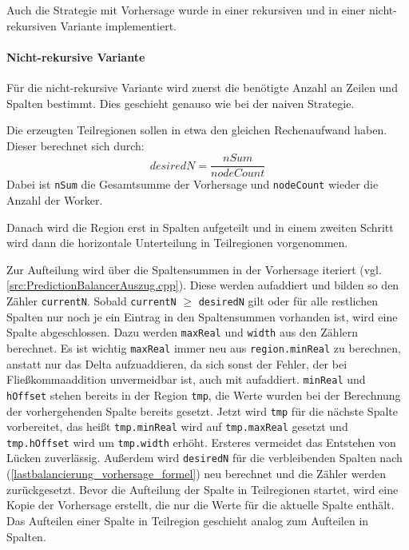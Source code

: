 Auch die Strategie mit Vorhersage wurde in einer rekursiven und in einer nicht-rekursiven Variante implementiert.

\paragraph*{Nicht-rekursive Variante}\label{lastbalancierung_vorhersage}
Für die nicht-rekursive Variante wird zuerst die benötigte Anzahl an Zeilen und Spalten bestimmt.
Dies geschieht genauso wie bei der naiven Strategie.

Die erzeugten Teilregionen sollen in etwa den gleichen Rechenaufwand haben. Dieser berechnet sich durch:
\begin{equation}\label{lastbalancierung_vorhersage_formel}
	desiredN = \frac{nSum}{nodeCount}
\end{equation}
Dabei ist \verb|nSum| die Gesamtsumme der Vorhersage und \verb|nodeCount| wieder die Anzahl der Worker.

Danach wird die Region erst in Spalten aufgeteilt und in einem zweiten Schritt wird dann die horizontale Unterteilung in Teilregionen vorgenommen.

Zur Aufteilung wird über die Spaltensummen in der Vorhersage iteriert (vgl. \autoref{src:PredictionBalancerAuszug.cpp}). Diese werden aufaddiert und bilden so den Zähler \verb|currentN|.
Sobald \verb|currentN| $\geq$ \verb|desiredN| gilt oder für alle restlichen Spalten nur noch je ein Eintrag in den Spaltensummen vorhanden ist, wird eine Spalte abgeschlossen.
Dazu werden \verb|maxReal| und \verb|width| aus den Zählern berechnet. Es ist wichtig \verb|maxReal| immer neu aus \verb|region.minReal| zu berechnen, anstatt nur das Delta aufzuaddieren, da sich sonst der Fehler, der bei Fließkommaaddition unvermeidbar ist, auch mit aufaddiert. \verb|minReal| und \verb|hOffset| stehen bereits in der Region \verb|tmp|, die Werte wurden bei der Berechnung der vorhergehenden Spalte bereits gesetzt.
Jetzt wird \verb|tmp| für die nächste Spalte vorbereitet, das heißt \verb|tmp.minReal| wird auf \verb|tmp.maxReal| gesetzt und \verb|tmp.hOffset| wird um \verb|tmp.width| erhöht. Ersteres vermeidet das Entstehen von Lücken zuverlässig.
Außerdem wird \verb|desiredN| für die verbleibenden Spalten nach (\ref{lastbalancierung_vorhersage_formel}) neu berechnet und die Zähler werden zurückgesetzt.
Bevor die Aufteilung der Spalte in Teilregionen startet, wird eine Kopie der Vorhersage erstellt, die nur die Werte für die aktuelle Spalte enthält.
Das Aufteilen einer Spalte in Teilregion geschieht analog zum Aufteilen in Spalten.

